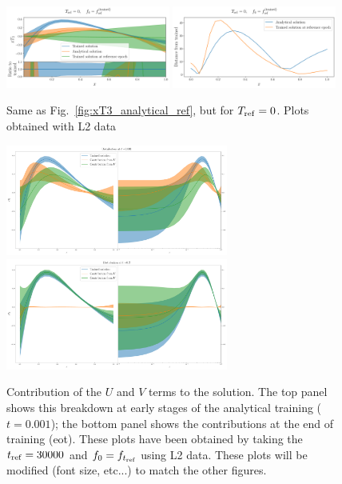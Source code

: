   \begin{figure}[h]
    \centering
    \includegraphics[width=0.48\textwidth]{plots/pdf_plot_ref_0.pdf}
    \includegraphics[width=0.48\textwidth]{plots/distance_plot_ref_0.pdf}
    \caption{Same as Fig.~\ref{fig:xT3_analytical_ref}, but for $T_{\rm ref} = 0$.
    \ac{Plots obtained with L2 data}}
    \label{fig:xT3_analytical_ref_0}
  \end{figure}

\begin{figure}[t!]
    \centering
    \includegraphics[width=0.65\textwidth]{plots/xT3_u_v_contribution_small_t.pdf}
    \\
    \includegraphics[width=0.65\textwidth]{plots/xT3_u_v_contribution_eot.pdf}
    \caption{Contribution of the $U$ and $V$ terms to the solution. The top panel
    shows this breakdown at early stages of the analytical training ($t=0.001$);
    the bottom panel shows the contributions at the end of training (eot). 
    These plots have been obtained by taking the
    $t_{\rm ref} = 30000$ and $f_0 = f_{t_{\rm ref}}$ using L2 data. \ac{These
    plots will be modified (font size, etc...) to match the other figures.}}
  \end{figure}


\FloatBarrier
